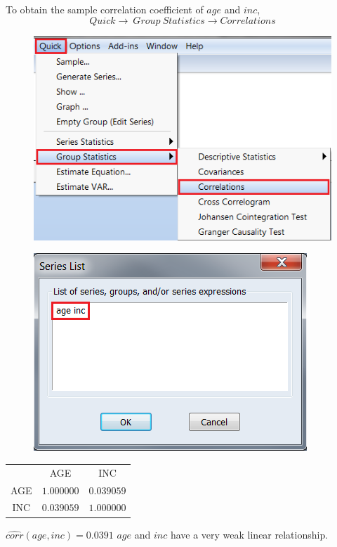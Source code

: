 \documentclass[12pt]{report}
\begin{document}
\noindent To obtain the sample correlation coefficient of $age$ and $inc$, $$Quick \to\ Group\ Statistics \to Correlations$$
\begin{figure}[H]
	\centering
	\includegraphics{tute6_q3_8}
\end{figure}
\vspace{-\baselineskip}
\begin{figure}[H]
	\centering
	\includegraphics{tute6_q3_9}
\end{figure}
\vspace{-\baselineskip}
\begin{table}[H]
	\centering
	\begin{tabular}{lrr}
		\multicolumn{1}{c}{}&\multicolumn{1}{c}{AGE}&\multicolumn{1}{c}{INC}\\
		\multicolumn{1}{c}{AGE}&\multicolumn{1}{c}{$1.000000$}&\multicolumn{1}{c}{$0.039059$}\\
		\multicolumn{1}{c}{INC}&\multicolumn{1}{c}{$0.039059$}&\multicolumn{1}{c}{$1.000000$}\\
	\end{tabular}
\end{table} \vspace{-\baselineskip}
\centering $\widehat{corr}(age,inc) = 0.0391$
\justify $age$ and $inc$ have a very weak linear relationship.
\end{document}
